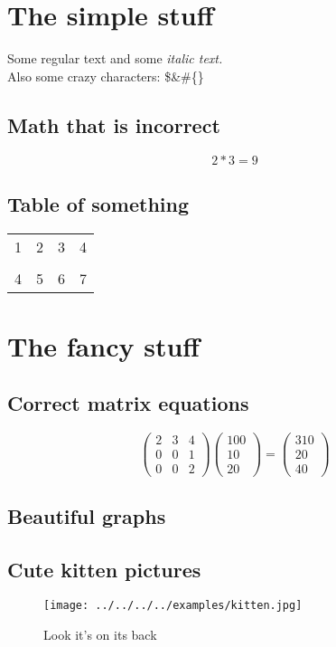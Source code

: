 \documentclass{article}%
\begin{document}
%
\section*{The simple stuff}%
Some regular text and some%
\textit{italic text. }%
\\%
Also some crazy characters: \$\&\#\{\}%
\subsection*{Math that is incorrect}%
$$%
2*3 = 9%
$$

%
\subsection*{Table of something}%
\begin{tabular}{rc|cl}%
\hline%
1&2&3&4\\%
\cline{1-2}%
&&&\\%
4&5&6&7\\%
\end{tabular}

%
\section*{The fancy stuff}%
\subsection*{Correct matrix equations}%
$$%
\begin{pmatrix}%
2&3&4\\%
0&0&1\\%
0&0&2%
\end{pmatrix} \begin{pmatrix}%
100\\%
10\\%
20%
\end{pmatrix} = \begin{pmatrix}%
310\\%
20\\%
40%
\end{pmatrix}%
$$

%
\subsection*{Beautiful graphs}%

%
\subsection*{Cute kitten pictures}%


\begin{figure}[h!]%
\centering%
\texttt{[image: ../../../../examples/kitten.jpg]}%
\caption{Look it's on its back}%
\end{figure}

%
\end{document}
